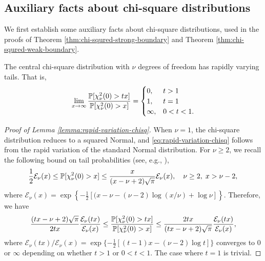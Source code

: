 

\subsection{Auxiliary facts about chi-square distributions}

We first establish some auxiliary facts about chi-square distributions, used in the proofs of Theorem \ref{thm:chi-squred-strong-boundary} and Theorem \ref{thm:chi-squred-weak-boundary}.

\begin{lemma} \label{lemma:rapid-variation-chisq}
The central chi-square distribution with $\nu$ degrees of freedom has rapidly varying tails.
That is, 
\begin{equation} \label{eq:rapid-variation-chisq}
    \lim_{x\to\infty}\frac{\P[\chi_\nu^2(0)>tx]}{\P[\chi_\nu^2(0)>x]} = 
    \begin{cases}
    0, & t > 1 \\
    1, & t = 1 \\
    \infty, & 0 < t < 1.
\end{cases}
\end{equation}
\end{lemma}

\begin{proof}[Proof of Lemma \ref{lemma:rapid-variation-chisq}]
When $\nu=1$, the chi-square distribution reduces to a squared Normal, and \eqref{eq:rapid-variation-chisq} follows from the rapid variation of the standard Normal distribution.
For $\nu\ge2$, we recall the following bound on tail probabilities (see, e.g., \citep{inglot2010inequalities}),
$$
\frac{1}{2}\mathcal{E}_\nu(x) \le \P[\chi_\nu^2(0)>x] \le \frac{x}{(x-\nu+2)\sqrt{\pi}} \mathcal{E}_\nu(x), \quad \nu\ge2,\;x>\nu-2,
$$
where $\mathcal{E}_\nu(x) = \exp\left\{-\frac{1}{2}[(x-\nu-(\nu-2)\log(x/\nu) + \log\nu]\right\}$.
Therefore, we have 
$$
\frac{(tx-\nu+2)\sqrt{\pi}}{2tx}\frac{\mathcal{E}_\nu(tx)}{\mathcal{E}_\nu(x)} 
\le \frac{\P[\chi_\nu^2(0)>tx]}{\P[\chi_\nu^2(0)>x]}
\le \frac{2tx}{(tx-\nu+2)\sqrt{\pi}}\frac{\mathcal{E}_\nu(tx)}{\mathcal{E}_\nu(x)},
$$
where ${\mathcal{E}_\nu(tx)}/{\mathcal{E}_\nu(x)} = \exp\{-\frac{1}{2}[(t-1)x-(\nu-2)\log{t}]\}$ converges to $0$ or $\infty$ depending on whether $t>1$ or $0<t<1$.
The case where $t=1$ is trivial.
\end{proof}

